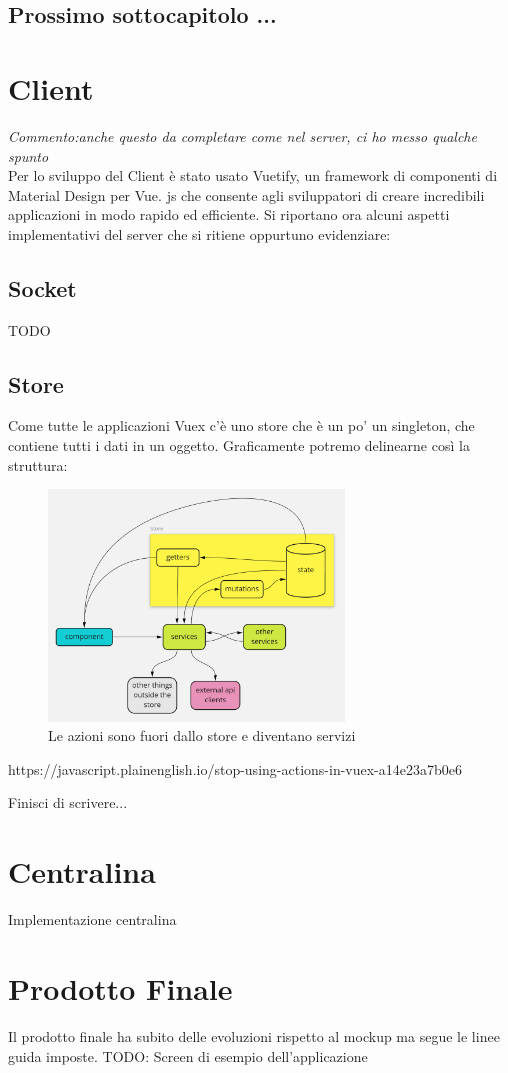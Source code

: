 \subsection{Prossimo sottocapitolo ...}


\section{Client}
\textit{Commento:anche questo da completare come nel server, ci ho messo qualche spunto}\\
Per lo sviluppo del Client è stato usato Vuetify, un framework di componenti di Material Design per Vue. js che consente agli sviluppatori di creare incredibili applicazioni in modo rapido ed efficiente.
Si riportano ora alcuni aspetti implementativi del server che si ritiene oppurtuno evidenziare: 
\subsection{Socket}
TODO

\subsection{Store}
Come tutte le applicazioni Vuex c'è uno store che è un po' un singleton, che contiene tutti i dati in un oggetto.
Graficamente potremo delinearne così la struttura:
\begin{figure}[H]
    \caption{Le azioni sono fuori dallo store e diventano servizi}
    \label{fig:Store}
    \centering
    \includegraphics[width=0.7\textwidth]{Images/store.png}
\end{figure}
https://javascript.plainenglish.io/stop-using-actions-in-vuex-a14e23a7b0e6

Finisci di scrivere...

\section{Centralina}
Implementazione centralina


\section{Prodotto Finale}
\label{prodottofinale}
Il prodotto finale ha subito delle evoluzioni rispetto al mockup ma segue le linee
guida imposte.
TODO: Screen di esempio dell'applicazione